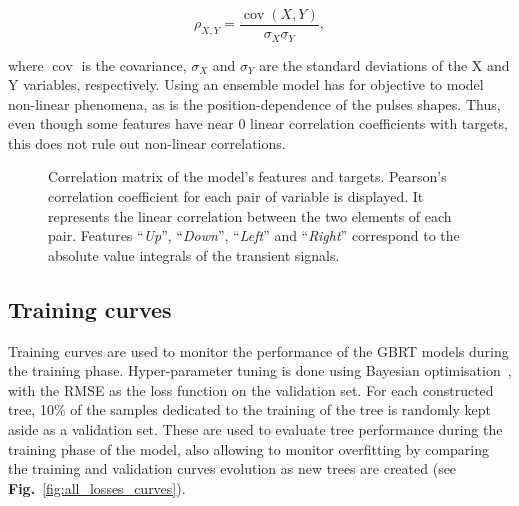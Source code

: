 \begin{equation}
    \rho_{X,Y}={\frac {\operatorname {cov} (X,Y)}{\sigma _{X}\sigma _{Y}}},
\end{equation}

\noindent where $\operatorname{cov}$ is the covariance, $\sigma_X$ and $\sigma_Y$ are the standard deviations of the X and Y variables, respectively.
Using an ensemble model has for objective to model non-linear phenomena, as is the position-dependence of the pulses shapes. Thus, even though some features have near 0 linear correlation coefficients with targets, this does not rule out non-linear correlations.

\begin{figure}
\centering
{}
\caption{Correlation matrix of the model's features and targets. Pearson's correlation coefficient for each pair of variable is displayed. It represents the linear correlation between the two elements of each pair. Features ``\textit{Up}'', ``\textit{Down}'', ``\textit{Left}'' and ``\textit{Right}'' correspond to the absolute value integrals of the transient signals.}
\label{fig:corr_matrix}
\end{figure}

\subsection{Training curves}
Training curves are used to monitor the performance of the GBRT models during the training phase. Hyper-parameter tuning is done using Bayesian optimisation~\cite{Akiba2019}, with the RMSE as the loss function on the validation set. For each constructed tree, 10\% of the samples dedicated to the training of the tree is randomly kept aside as a validation set. These are used to evaluate tree performance during the training phase of the model, also allowing to monitor overfitting by comparing the training and validation curves evolution as new trees are created (see \textbf{Fig.}~\ref{fig:all_losses_curves}). 


